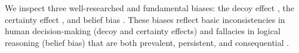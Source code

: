 


We inspect three well-researched and fundamental biases:
the decoy effect
\cite{huber1982adding}, 
the certainty effect %
\cite{kahneman1979prospect}, 
and belief bias
\cite{evans1983conflict}.
These biases reflect basic inconsistencies in human decision-making (decoy and certainty effects)
and fallacies in logical reasoning (belief bias)
that are both prevalent, persistent, and consequential
\cite{berthet2022impact,acciarini2021cognitive}.

